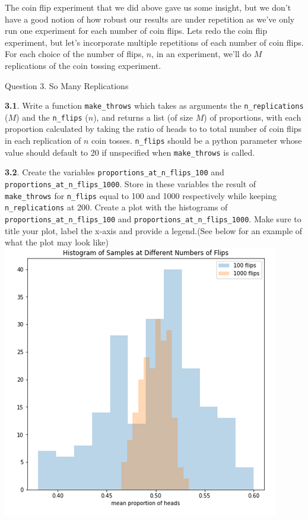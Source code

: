 \documentclass[11pt]{article}
\makeatletter
\def\maxwidth{\ifdim\Gin@nat@width>\linewidth\linewidth
    \else\Gin@nat@width\fi}
\let\Oldincludegraphics\includegraphics
\renewcommand{\includegraphics}[1]{\Oldincludegraphics[width=.8\maxwidth]{#1}}
\makeatother
\begin{document}
The coin flip experiment that we did above gave us some insight, but we
don't have a good notion of how robust our results are under repetition
as we've only run one experiment for each number of coin flips. Lets
redo the coin flip experiment, but let's incorporate multiple
repetitions of each number of coin flips. For each choice of the number
of flips, \(n\), in an experiment, we'll do \(M\) replications of the
coin tossing experiment.

     Question 3. So Many Replications

\textbf{3.1}. Write a function \texttt{make\_throws} which takes as
arguments the \texttt{n\_replications} (\(M\)) and the \texttt{n\_flips}
(\(n\)), and returns a list (of size \(M\)) of proportions, with each
proportion calculated by taking the ratio of heads to to total number of
coin flips in each replication of \(n\) coin tosses. \texttt{n\_flips}
should be a python parameter whose value should default to 20 if
unspecified when \texttt{make\_throws} is called.

\textbf{3.2}. Create the variables
\texttt{proportions\_at\_n\_flips\_100} and
\texttt{proportions\_at\_n\_flips\_1000}. Store in these variables the
result of \texttt{make\_throws} for \texttt{n\_flips} equal to 100 and
1000 respectively while keeping \texttt{n\_replications} at 200. Create
a plot with the histograms of \texttt{proportions\_at\_n\_flips\_100}
and \texttt{proportions\_at\_n\_flips\_1000}. Make sure to title your
plot, label the x-axis and provide a legend.(See below for an example of
what the plot may look like) \includegraphics{./figs/HW0Plot2.png}
\end{document}
